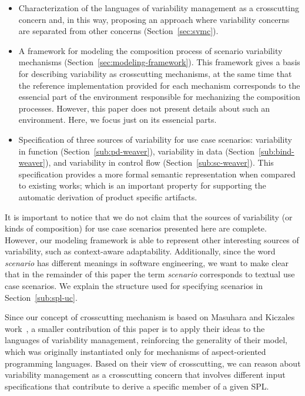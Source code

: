\documentclass{acm_proc_article-sp}
\begin{document}
\begin{itemize}
\item Characterization of the languages of variability management as a
crosscutting concern and, in this way, proposing an approach where variability
concerns are separated from other concerns (Section~\ref{sec:svmc}).


\item A framework for modeling the composition process of scenario variability
mechanisms (Section~\ref{sec:modeling-framework}). This framework gives a basis
for describing variability as crosscutting mechanisms, {\color{red}at the same
time that the reference implementation provided for each mechanism corresponds to the
essencial part of the environment responsible for mechanizing the composition
processes. However, this paper does not present details about such an environment. Here,
we focus just on its essencial parts.}

\item Specification of three {\color{red}sources of variability for use case
scenarios: variability in function (Section~\ref{sub:pd-weaver}),
variability in data (Section~\ref{sub:bind-weaver}), and variability in control
flow (Section~\ref{sub:sc-weaver})}. This specification provides a more formal
semantic representation when compared to existing works; which is an important property
for supporting the automatic derivation of product specific artifacts.
\end{itemize}

{\color{red}It is important to notice that we do not claim that the sources of
variability (or kinds of composition) for use case scenarios presented here are complete.
However, our modeling framework is able to represent
other interesting sources of variability, such as context-aware adaptability.
Additionally, since the word \emph{scenario} has different meanings in software
engineering, we want to make clear that in the remainder of this paper the term
\emph{scenario} corresponds to textual use case scenarios. We explain the structure
used for specifying scenarios in Section~\ref{sub:spl-uc}}.

Since our concept of crosscutting mechanism is based on Masuhara and Kiczales
work~\cite{Masuhara:2003aa}, a smaller contribution of this paper is to apply
their ideas to the languages of variability management,  reinforcing the
generality of their model, which was originally instantiated only for mechanisms
of aspect-oriented programming languages. Based on their view of crosscutting, we
can reason about variability management as a crosscutting concern that involves
different input specifications that contribute to derive a specific member of a
given SPL. 
\end{document}
